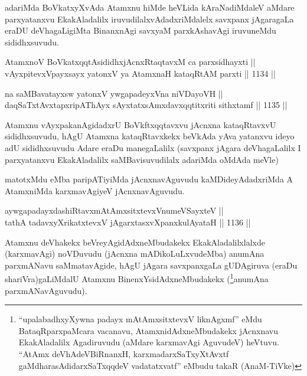 \begin{artha}
adariMda BoVkatxyXvAda Atamxnu hiMde heVLida kAraNadiMdaleV aMdare parxyatanxvu EkakAladalilx iruvudilalxvAdadxriMdalelx savxpanx jAgaragaLa eraDU deVhagaLigiMta BinanxnAgi savxyaM parxkAshavAgi iruvuneMdu sididhxsuvudu.
\end{artha}


\begin{shl}
\footnotemark[1]AtamxnoV BoVkatxqqtAsididhxjAcnxRtaqtavxM ca parxsidhayxti || \\
vAyxpitevxV\s payxsayx yatonxV ya AtamxnaH kataqRtAM parxti ||  1134 ||  
\end{shl}
				
\begin{shl}
na saMBavatayxsw yatonxV ywgapadeyxVna niVDayoVH || \\
daqSaTxtAvxtapxripAThAyx sAyxtatxsAmxdavxqqtitxriti sithxtamf ||  1135 ||  
\end{shl}

\begin{artha}
Atamxnu vAyxpakanAgidadxrU BoVkftxqqtavxvu jAcnxna kataqRtavxvU sididhxsuvudu, hAgU Atamxna kataqRtavxkekx beVkAda yAva yatanxvu ideyo adU sididhxsuvudu Adare eraDu manegaLalilx (savxpanx jAgara deVhagaLalilx I parxyatanxvu EkakAladalilx saMBavisuvudilalx adariMda oMdAda meVle)
\end{artha}

\begin{artha}
matotxMdu eMba paripATiyiMda jAcnxnavAguvudu kaMDideyAdadxriMda A AtamxniMda karxmavAgiyeV jAcnxnavAguvudu.
\end{artha}

\begin{shl}
aywgapadayxdashiRtavxmAtAmxsitxtevxV\s numeVSayxteV || \\
tathA tadavxyXrikatxtevxV jAgarxtasxvXpanxkulAyataH ||  1136 ||  
\end{shl}

\begin{artha}
Atamxnu deVhakekx beVreyAgidAdxneMbudakekx EkakAladalilxlalxde (karxmavAgi) noVDuvudu (jAcnxna mADikoLuLxvudeMba) anumAna parxmANavu saMmatavAgide, hAgU jAgara savxpanxgaLa gUDAgiruva (eraDu shariVra)gaLiMdalU Atamxnu BinenxYsidAdxneMbudakekx (\footnote{``upalabadhxyXywna padayx mAtAmxsitxtevxV liknAgxmf'' eMdu BataqRparxpaMcara vacanavu, AtamxnidAdxneMbudakekx jAcnxnavu EkakAladalilx Agadiruvudu (aMdare karxmavAgi AguvudeV) heVtuvu. ``AtAmx deVhAdeVBiRnanxH, karxmadarxSaTxyXtAvxtf gaMdharasAdidarxSaTxqqdeV vadatatxvatf'' eMbudu takaR (AnaM-TiVke)}anumAna parxmANavAguvudu).
\end{artha}

